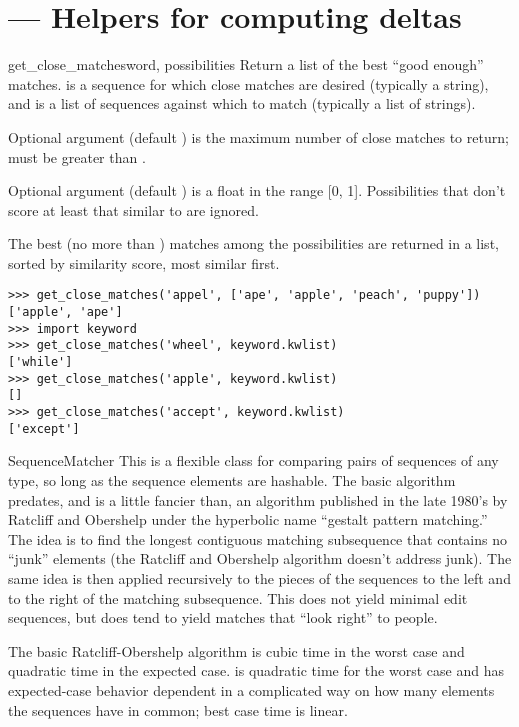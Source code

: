 \section{ ---
         Helpers for computing deltas}


\begin{funcdesc}{get_close_matches}{word, possibilities}
  Return a list of the best ``good enough'' matches.   is a
  sequence for which close matches are desired (typically a string),
  and  is a list of sequences against which to
  match  (typically a list of strings).

  Optional argument  (default ) is the maximum number
  of close matches to return;  must be greater than .

  Optional argument  (default ) is a float in
  the range [0, 1].  Possibilities that don't score at least that
  similar to  are ignored.

  The best (no more than ) matches among the possibilities are
  returned in a list, sorted by similarity score, most similar first.

\begin{verbatim}
>>> get_close_matches('appel', ['ape', 'apple', 'peach', 'puppy'])
['apple', 'ape']
>>> import keyword
>>> get_close_matches('wheel', keyword.kwlist)
['while']
>>> get_close_matches('apple', keyword.kwlist)
[]
>>> get_close_matches('accept', keyword.kwlist)
['except']
\end{verbatim}
\end{funcdesc}

\begin{classdesc}{SequenceMatcher}{\unspecified}
  This is a flexible class for comparing pairs of sequences of any
  type, so long as the sequence elements are hashable.  The basic
  algorithm predates, and is a little fancier than, an algorithm
  published in the late 1980's by Ratcliff and Obershelp under the
  hyperbolic name ``gestalt pattern matching.''  The idea is to find
  the longest contiguous matching subsequence that contains no
  ``junk'' elements (the Ratcliff and Obershelp algorithm doesn't
  address junk).  The same idea is then applied recursively to the
  pieces of the sequences to the left and to the right of the matching
  subsequence.  This does not yield minimal edit sequences, but does
  tend to yield matches that ``look right'' to people.

   The basic Ratcliff-Obershelp algorithm is cubic
  time in the worst case and quadratic time in the expected case.
   is quadratic time for the worst case and has
  expected-case behavior dependent in a complicated way on how many
  elements the sequences have in common; best case time is linear.
\end{classdesc}


